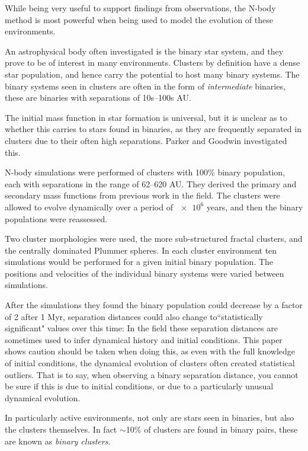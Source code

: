 \documentclass[a4paper,10pt]{article}
\begin{document}
While being very useful to support findings from observations, the N-body method is most powerful when being used to model the evolution of these environments. 

An astrophysical body often investigated is the binary star system, and they prove to be of interest in many environments. Clusters by definition have a dense star population, and hence carry the potential to host many binary systems. The binary systems seen in clusters are often in the form of \textit{intermediate} binaries, these are binaries with separations of 10s--100s AU. 

The initial mass function in star formation is universal, but it is unclear as to whether this carries to stars found in binaries, as they are frequently separated in clusters due to their often high separations. Parker and Goodwin investigated this\cite{Binaries}.

N-body simulations were performed of clusters with 100\% binary population, each with separations in the range of 62--620 AU. They derived the primary and secondary mass functions from previous work in the field. The clusters were allowed to evolve dynamically over a period of $\num{e6}$ years, and then the binary populations were reassessed. 

Two cluster morphologies were used, the more sub-structured fractal clusters, and the centrally dominated Plummer spheres. In each cluster environment ten simulations would be performed for a given initial binary population. The positions and velocities of the individual binary systems were varied between simulations. 

After the simulations they found the binary population could decrease by a factor of 2 after 1 Myr, separation distances could also change to``statistically significant" values over this time: In the field these separation distances are sometimes used to infer dynamical history and initial conditions. This paper shows caution should be taken when doing this, as even with the full knowledge of initial conditions, the dynamical evolution of clusters often created statistical outliers. That is to say, when observing a binary separation distance, you cannot be sure if this is due to initial conditions, or due to a particularly unusual dynamical evolution.

In particularly active environments, not only are stars seen in binaries, but also the clusters themselves. In fact $\sim$10\% of clusters are found in binary pairs, these are known as \textit{binary clusters}. 
\end{document}
